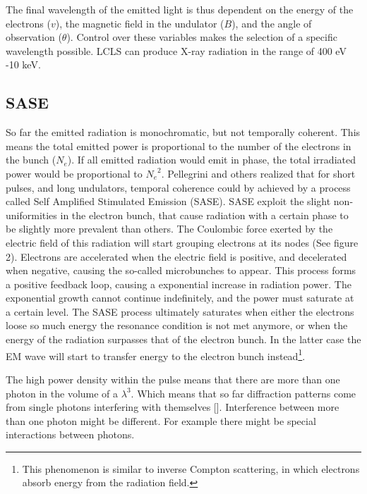 The final wavelength of the emitted light is thus dependent on the energy of the electrons ($v$), the magnetic field in the undulator ($B$), and the angle of observation ($\theta$). Control over these variables makes the selection of a specific wavelength possible. LCLS can produce X-ray radiation in the range of 400 eV -10 keV. 


\subsection{SASE}
So far the emitted radiation is monochromatic, but not temporally coherent. This means the total emitted power is proportional to the number of the electrons in the bunch ($N_e$). If all emitted radiation would emit in phase, the total irradiated power would be proportional to ${N_e}^2$. Pellegrini and others realized that for short pulses, and long undulators, temporal coherence could by achieved by a process called Self Amplified Stimulated Emission (SASE). SASE exploit the slight non-uniformities in the electron bunch, that cause radiation with a certain phase to be slightly more prevalent than others. The Coulombic force exerted by the electric field of this radiation will start grouping electrons at its nodes (See figure 2). Electrons are accelerated when the electric field is positive, and decelerated when negative, causing the so-called microbunches to appear. This process forms a positive feedback loop, causing a exponential increase in radiation power. The  exponential  growth  cannot  continue  indefinitely, and  the  power  must  saturate  at  a  certain  level. The SASE process ultimately saturates when either the electrons loose so much energy the resonance condition is not met anymore, or when the energy of the radiation surpasses that of the electron bunch. In the latter case the EM wave will start to transfer energy to the electron bunch instead\footnote{This phenomenon is similar to inverse Compton scattering, in which electrons absorb energy from the radiation field.}.

The high power density within the pulse means that there are more than one photon in the volume of a $\lambda^3$. Which means that so far diffraction patterns come from single photons interfering with themselves []. Interference between more than one photon might be different. For example there might be special interactions between photons. 





